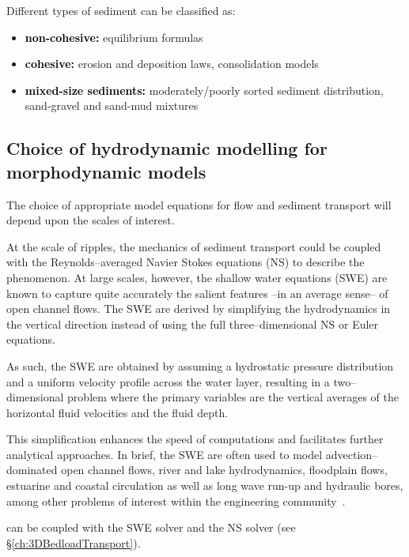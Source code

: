 \noindent
Different types of sediment can be classified as:
\begin{itemize}
\item \textcolor{black}{\bf non-cohesive:} equilibrium formulas
\item \textcolor{black}{\bf cohesive:} erosion and deposition laws, consolidation models
\item \textcolor{black}{\bf mixed-size sediments:} moderately/poorly sorted sediment distribution, sand-gravel and sand-mud mixtures
\end{itemize}
\noindent


\subsection{Choice of hydrodynamic modelling for morphodynamic models}
The choice of appropriate model equations for flow and sediment transport
will depend upon the scales of interest. 

At the scale of ripples, the mechanics of sediment transport could be coupled with the
Reynolds--averaged Navier Stokes equations (NS) to describe the phenomenon.
At large scales, however, the shallow water equations (SWE) are known to
capture quite accurately the salient features --in an average sense-- of 
open channel flows. The SWE are derived by simplifying the hydrodynamics in the vertical
direction instead of using the full three--dimensional NS or Euler
equations.

As such, the SWE are obtained by assuming a hydrostatic pressure
distribution and a uniform velocity profile across the water layer,
resulting in a two--dimensional problem where the primary variables are the
vertical averages of the horizontal fluid velocities and the fluid depth.

This simplification enhances the speed of computations and
facilitates further analytical approaches. In brief, the SWE are often
used to model advection--dominated open channel flows, river and lake
hydrodynamics, floodplain flows, estuarine and coastal circulation as well
as long wave run-up and hydraulic bores, among
other problems of interest within the engineering community~\cite{Vreugdenhil:94}. 

\sisyphe{} can be coupled with the SWE solver  and the NS solver  (see \S\ref{ch:3DBedloadTransport}). 

